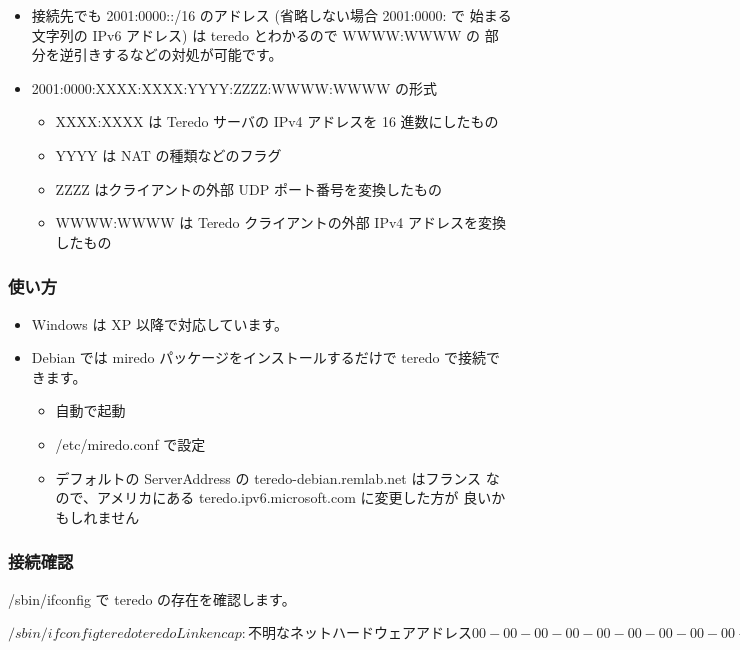 \documentclass[mingoth,a4paper]{jsarticle}
\begin{document}
\begin{itemize}
\item 接続先でも 2001:0000::/16 のアドレス (省略しない場合 2001:0000: で
  始まる文字列の IPv6 アドレス) は teredo とわかるので WWWW:WWWW の
  部分を逆引きするなどの対処が可能です。
\item 2001:0000:XXXX:XXXX:YYYY:ZZZZ:WWWW:WWWW の形式

\begin{itemize}
\item XXXX:XXXX は Teredo サーバの IPv4 アドレスを 16 進数にしたもの
\item YYYY は NAT の種類などのフラグ
\item ZZZZ はクライアントの外部 UDP ポート番号を変換したもの
\item WWWW:WWWW は Teredo クライアントの外部 IPv4 アドレスを変換したもの
\end{itemize}

\end{itemize}
\subsubsection{使い方}


\begin{itemize}
\item Windows は XP 以降で対応しています。
\item Debian では miredo パッケージをインストールするだけで teredo で接続できます。

\begin{itemize}
\item 自動で起動
\item /etc/miredo.conf で設定
\item デフォルトの ServerAddress の teredo-debian.remlab.net はフランス
    なので、アメリカにある teredo.ipv6.microsoft.com に変更した方が
    良いかもしれません
\end{itemize}

\end{itemize}
\subsubsection{接続確認}

/sbin/ifconfig で teredo の存在を確認します。

\begin{commandline}
$ /sbin/ifconfig teredo
teredo    Link encap:不明なネット  ハードウェアアドレス 00-00-00-00-00-00-00-00-00-00-00-00-00-00-00-00
          inet6アドレス: fe80::ffff:ffff:ffff/64 範囲:リンク
          inet6アドレス: 2001:0:4137:9e76:34c1:f58:XXXX:XXXX/32 範囲:グローバル
          UP POINTOPOINT RUNNING NOARP MULTICAST  MTU:1280  メトリック:1
          RXパケット:0 エラー:0 損失:0 オーバラン:0 フレーム:0
          TXパケット:3 エラー:0 損失:0 オーバラン:0 キャリア:0
      衝突(Collisions):0 TXキュー長:500
          RXバイト:0 (0.0 B)  TXバイト:144 (144.0 B)
$
\end{commandline}
\end{document}

